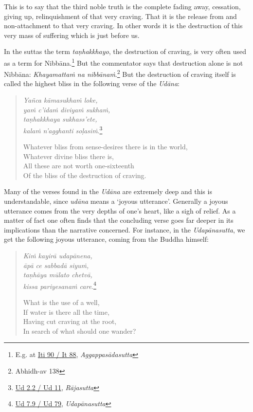 This is to say that the third noble truth is the complete fading away, cessation, giving up, relinquishment of that very craving. That it is the release from and non-attachment to that very craving. In other words it is the destruction of this very mass of suffering which is just before us.

In the suttas the term \emph{taṇhakkhayo}, the destruction of craving, is very often used as a term for Nibbāna.\footnote{E.g. at \href{https://suttacentral.net/iti90/pli/ms}{Iti 90 / It 88}, \emph{Aggappasādasutta}} But the commentator says that destruction alone is not Nibbāna: \emph{Khayamattaṁ na nibbānaṁ}.\footnote{Abhidh-av 138} But the destruction of craving itself is called the highest bliss in the following verse of the \emph{Udāna}:

\begin{quote}
\emph{Yañca kāmasukhaṁ loke,}\\
\emph{yaṁ c'idaṁ diviyaṁ sukhaṁ,}\\
\emph{taṇhakkhaya sukhass'ete,}\\
\emph{kalaṁ n'agghanti soḷasiṁ}.\footnote{\href{https://suttacentral.net/ud2.2/pli/ms}{Ud 2.2 / Ud 11}, \emph{Rājasutta}}

Whatever bliss from sense-desires there is in the world,\\
Whatever divine bliss there is,\\
All these are not worth one-sixteenth\\
Of the bliss of the destruction of craving.
\end{quote}

Many of the verses found in the \emph{Udāna} are extremely deep and this is understandable, since \emph{udāna} means a `joyous utterance'. Generally a joyous utterance comes from the very depths of one's heart, like a sigh of relief. As a matter of fact one often finds that the concluding verse goes far deeper in its implications than the narrative concerned. For instance, in the \emph{Udapānasutta}, we get the following joyous utterance, coming from the Buddha himself:

\begin{quote}
\emph{Kiṁ kayirā udapānena,}\\
\emph{āpā ce sabbadā siyuṁ,}\\
\emph{taṇhāya mūlato chetvā,}\\
\emph{kissa pariyesanaṁ care}.\footnote{\href{https://suttacentral.net/ud7.9/pli/ms}{Ud 7.9 / Ud 79}, \emph{Udapānasutta}}

What is the use of a well,\\
If water is there all the time,\\
Having cut craving at the root,\\
In search of what should one wander?
\end{quote}

